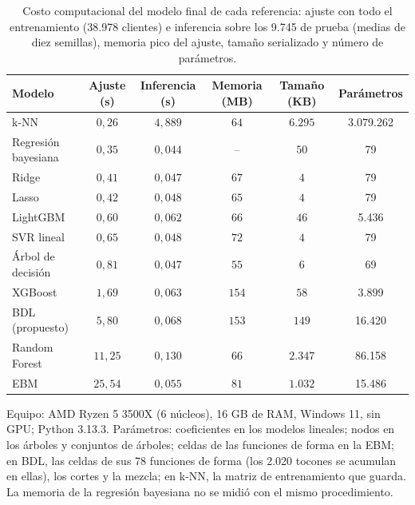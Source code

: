 \begin{table}[tbp]
  \centering\scriptsize\setlength{\tabcolsep}{4pt}
  \caption{Costo computacional del modelo final de cada referencia: ajuste con todo el entrenamiento (38.978 clientes) e inferencia sobre los 9.745 de prueba (medias de diez semillas), memoria pico del ajuste, tamaño serializado y número de parámetros.}
  \label{tab:costo}
  \begin{tabular}{lccccc}
    \toprule
    Modelo & Ajuste (s) & Inferencia (s) & Memoria (MB) & Tamaño (KB) & Parámetros \\
    \midrule
    k-NN & $0{,}26$ & $4{,}889$ & $64$ & $6.295$ & 3.079.262 \\
    Regresión bayesiana & $0{,}35$ & $0{,}044$ & -- & $50$ & 79 \\
    Ridge & $0{,}41$ & $0{,}047$ & $67$ & $4$ & 79 \\
    Lasso & $0{,}42$ & $0{,}048$ & $65$ & $4$ & 79 \\
    LightGBM & $0{,}60$ & $0{,}062$ & $66$ & $46$ & 5.436 \\
    SVR lineal & $0{,}65$ & $0{,}048$ & $72$ & $4$ & 79 \\
    Árbol de decisión & $0{,}81$ & $0{,}047$ & $55$ & $6$ & 69 \\
    XGBoost & $1{,}69$ & $0{,}063$ & $154$ & $58$ & 3.899 \\
    BDL (propuesto) & $5{,}80$ & $0{,}068$ & $153$ & $149$ & 16.420 \\
    Random Forest & $11{,}25$ & $0{,}130$ & $66$ & $2.347$ & 86.158 \\
    EBM & $25{,}54$ & $0{,}055$ & $81$ & $1.032$ & 15.486 \\
    \bottomrule
  \end{tabular}
  \par\smallskip\begin{minipage}{0.97\linewidth}\scriptsize Equipo: AMD Ryzen 5 3500X (6 núcleos), 16 GB de RAM, Windows 11, sin GPU; Python 3.13.3. Parámetros: coeficientes en los modelos lineales; nodos en los árboles y conjuntos de árboles; celdas de las funciones de forma en la EBM; en BDL, las celdas de sus 78 funciones de forma (los 2.020 tocones se acumulan en ellas), los cortes y la mezcla; en k-NN, la matriz de entrenamiento que guarda. La memoria de la regresión bayesiana no se midió con el mismo procedimiento.\end{minipage}
\end{table}

